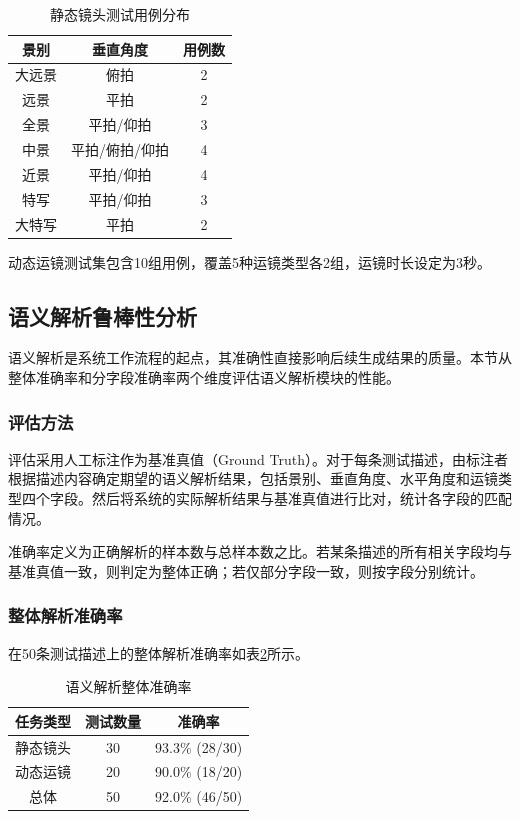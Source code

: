 \begin{table}[htbp]
\centering
\caption{静态镜头测试用例分布}
\label{tab:static_test_cases}
\begin{tabular}{ccc}
\toprule
景别 & 垂直角度 & 用例数 \\
\midrule
大远景 & 俯拍 & 2 \\
远景 & 平拍 & 2 \\
全景 & 平拍/仰拍 & 3 \\
中景 & 平拍/俯拍/仰拍 & 4 \\
近景 & 平拍/仰拍 & 4 \\
特写 & 平拍/仰拍 & 3 \\
大特写 & 平拍 & 2 \\
\bottomrule
\end{tabular}
\end{table}

动态运镜测试集包含10组用例，覆盖5种运镜类型各2组，运镜时长设定为3秒。

\subsection{语义解析鲁棒性分析}

语义解析是系统工作流程的起点，其准确性直接影响后续生成结果的质量。本节从整体准确率和分字段准确率两个维度评估语义解析模块的性能。

\subsubsection{评估方法}

评估采用人工标注作为基准真值（Ground Truth）。对于每条测试描述，由标注者根据描述内容确定期望的语义解析结果，包括景别、垂直角度、水平角度和运镜类型四个字段。然后将系统的实际解析结果与基准真值进行比对，统计各字段的匹配情况。

准确率定义为正确解析的样本数与总样本数之比。若某条描述的所有相关字段均与基准真值一致，则判定为整体正确；若仅部分字段一致，则按字段分别统计。

\subsubsection{整体解析准确率}

在50条测试描述上的整体解析准确率如表\ref{tab:parsing_accuracy}所示。

\begin{table}[htbp]
\centering
\caption{语义解析整体准确率}
\label{tab:parsing_accuracy}
\begin{tabular}{ccc}
\toprule
任务类型 & 测试数量 & 准确率 \\
\midrule
静态镜头 & 30 & 93.3\% (28/30) \\
动态运镜 & 20 & 90.0\% (18/20) \\
\midrule
总体 & 50 & 92.0\% (46/50) \\
\bottomrule
\end{tabular}
\end{table}

